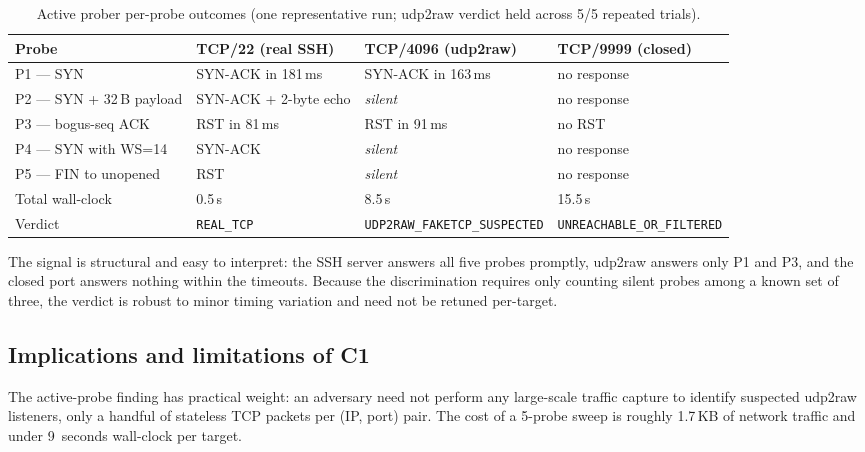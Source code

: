 \documentclass[conference]{IEEEtran}
\begin{document}
\begin{table}[t]
\centering
\caption{Active prober per-probe outcomes (one representative run; udp2raw
verdict held across 5/5 repeated trials).}
\label{tab:probe}
\renewcommand{\arraystretch}{1.15}
\begin{tabular}{@{}llll@{}}
\toprule
Probe & TCP/22 (real SSH) & TCP/4096 (udp2raw) & TCP/9999 (closed) \\
\midrule
P1 --- SYN                  & SYN-ACK in 181\,ms & SYN-ACK in 163\,ms & no response \\
P2 --- SYN + 32\,B payload  & SYN-ACK + 2-byte echo & \emph{silent} & no response \\
P3 --- bogus-seq ACK        & RST in 81\,ms      & RST in 91\,ms      & no RST \\
P4 --- SYN with WS=14       & SYN-ACK            & \emph{silent}      & no response \\
P5 --- FIN to unopened      & RST                & \emph{silent}      & no response \\
\midrule
Total wall-clock                     & 0.5\,s             & 8.5\,s             & 15.5\,s \\
Verdict                              & \texttt{REAL\_TCP} & \texttt{UDP2RAW\_FAKETCP\_SUSPECTED} & \texttt{UNREACHABLE\_OR\_FILTERED} \\
\bottomrule
\end{tabular}
\end{table}

The signal is structural and easy to interpret: the SSH server answers all
five probes promptly, udp2raw answers only P1 and P3, and the closed port
answers nothing within the timeouts. Because the discrimination requires
only counting silent probes among a known set of three, the verdict is
robust to minor timing variation and need not be retuned per-target.

\subsection{Implications and limitations of C1}

The active-probe finding has practical weight: an adversary need not
perform any large-scale traffic capture to identify suspected udp2raw
listeners, only a handful of stateless TCP packets per (IP, port) pair.
The cost of a 5-probe sweep is roughly 1.7\,KB of network traffic and
under 9~seconds wall-clock per target.
\end{document}
